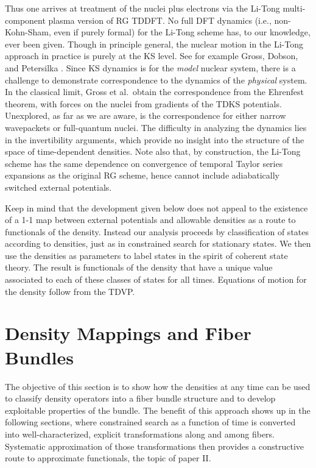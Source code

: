 \documentclass[aps,preprint]{revtex4}%
\begin{document}
Thus one arrives at treatment of the nuclei plus electrons via the Li-Tong
\cite{LiTong86} multi-component plasma version of RG TDDFT. No full DFT
dynamics (i.e., non-Kohn-Sham, even if purely formal) for the Li-Tong scheme
has, to our knowledge, ever been given. Though in principle general, the
nuclear motion in the Li-Tong approach in practice is purely at the KS level.
See for example Gross, Dobson, and Petersilka \cite{Gross96}. Since KS
dynamics is for the \emph{model} nuclear system, there is a challenge to
demonstrate correspondence to the dynamics of the \emph{physical} system. In
the classical limit, Gross et al.~obtain the correspondence from the Ehrenfest
theorem, with forces on the nuclei from gradients of the TDKS potentials.
Unexplored, as far as we are aware, is the correspondence for either narrow
wavepackets or full-quantum nuclei.\cite{Xchneglect} The difficulty in
analyzing the dynamics lies in the invertibility arguments, which provide no
insight into the structure of the space of time-dependent densities. Note also
that, by construction, the Li-Tong scheme has the same dependence on
convergence of temporal Taylor series expansions as the original RG scheme,
hence cannot include adiabatically switched external potentials.

Keep in mind that the development given below does not appeal to the existence
of a 1-1 map between external potentials and allowable densities as a route to
functionals of the density. Instead our analysis proceeds by classification of
states according to densities, just as in constrained search for stationary
states. We then use the densities as parameters to label states in the spirit
of coherent state theory. The result is functionals of the density that have a
unique value associated to each of these classes of states for all times.
Equations of motion for the density follow from the TDVP.\cite{KramSar}

\section{Density Mappings and Fiber Bundles}

\noindent The objective of this section is to show how the densities at any
time can be used to classify density operators into a fiber bundle structure
and to develop exploitable properties of the bundle. The benefit of this
approach shows up in the following sections, where constrained search as a
function of time is converted into well-characterized, explicit
transformations along and among fibers. Systematic approximation of those
transformations then provides a constructive route to approximate functionals,
the topic of paper II.
\end{document}
